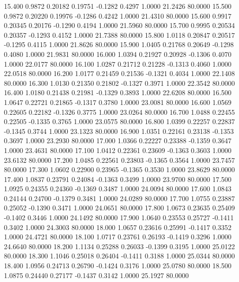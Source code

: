  15.400   0.9872   0.20182   0.19751  -0.1282   0.4297   1.0000  21.2426  80.0000
  15.500   0.9872   0.20220   0.19976  -0.1286   0.4242   1.0000  21.4310  80.0000
  15.600   0.9917   0.20345   0.20176  -0.1290   0.4194   1.0000  21.5960  80.0000
  15.700   0.9995   0.20534   0.20357  -0.1293   0.4152   1.0000  21.7388  80.0000
  15.800   1.0118   0.20847   0.20517  -0.1295   0.4115   1.0000  21.8626  80.0000
  15.900   1.0405   0.21768   0.20649  -0.1298   0.4080   1.0000  21.9831  80.0000
  16.000   1.0394   0.21927   0.20928  -0.1306   0.4070   1.0000  22.0177  80.0000
  16.100   1.0287   0.21712   0.21228  -0.1313   0.4060   1.0000  22.0518  80.0000
  16.200   1.0177   0.21459   0.21536  -0.1321   0.4034   1.0000  22.1408  80.0000
  16.300   1.0130   0.21350   0.21802  -0.1327   0.3971   1.0000  22.3542  80.0000
  16.400   1.0180   0.21438   0.21981  -0.1329   0.3893   1.0000  22.6208  80.0000
  16.500   1.0647   0.22721   0.21865  -0.1317   0.3780   1.0000  23.0081  80.0000
  16.600   1.0569   0.22605   0.22182  -0.1326   0.3775   1.0000  23.0264  80.0000
  16.700   1.0488   0.22455   0.22505  -0.1335   0.3765   1.0000  23.0575  80.0000
  16.800   1.0399   0.22257   0.22837  -0.1345   0.3744   1.0000  23.1323  80.0000
  16.900   1.0351   0.22161   0.23138  -0.1353   0.3697   1.0000  23.2930  80.0000
  17.000   1.0366   0.22227   0.23388  -0.1359   0.3647   1.0000  23.4631  80.0000
  17.100   1.0412   0.22361   0.23609  -0.1363   0.3603   1.0000  23.6132  80.0000
  17.200   1.0485   0.22561   0.23803  -0.1365   0.3564   1.0000  23.7457  80.0000
  17.300   1.0602   0.22900   0.23965  -0.1365   0.3530   1.0000  23.8629  80.0000
  17.400   1.0837   0.23791   0.24084  -0.1363   0.3499   1.0000  23.9700  80.0000
  17.500   1.0925   0.24355   0.24360  -0.1369   0.3487   1.0000  24.0094  80.0000
  17.600   1.0843   0.24144   0.24700  -0.1379   0.3481   1.0000  24.0289  80.0000
  17.700   1.0755   0.23887   0.25052  -0.1390   0.3471   1.0000  24.0651  80.0000
  17.800   1.0673   0.23635   0.25409  -0.1402   0.3446   1.0000  24.1492  80.0000
  17.900   1.0640   0.23553   0.25727  -0.1411   0.3402   1.0000  24.3003  80.0000
  18.000   1.0657   0.23616   0.25991  -0.1417   0.3352   1.0000  24.4721  80.0000
  18.100   1.0717   0.23761   0.26193  -0.1419   0.3296   1.0000  24.6640  80.0000
  18.200   1.1134   0.25288   0.26033  -0.1399   0.3195   1.0000  25.0122  80.0000
  18.300   1.1046   0.25018   0.26404  -0.1411   0.3188   1.0000  25.0344  80.0000
  18.400   1.0956   0.24713   0.26790  -0.1424   0.3176   1.0000  25.0780  80.0000
  18.500   1.0875   0.24440   0.27177  -0.1437   0.3142   1.0000  25.1927  80.0000
